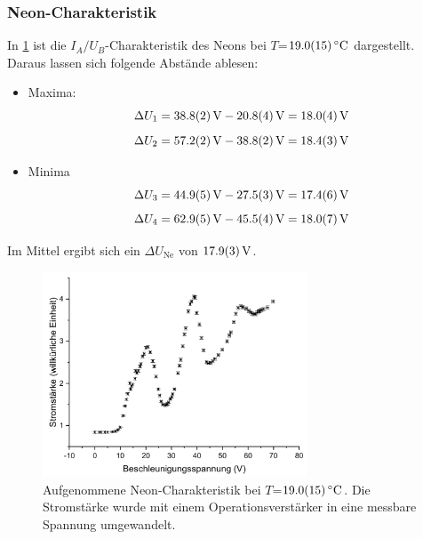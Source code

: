 \documentclass[
	a4paper,
	12pt,
	pagesize,
	ngerman
]{scrartcl}
\begin{document}
	\subsubsection{Neon-Charakteristik}
	In \cref{Ne19} ist die $I_A/U_B$-Charakteristik des Neons bei $T$=$\SI{19 +- 1,5}{\degreeCelsius}$ dargestellt. Daraus lassen sich folgende Abstände ablesen:
	\begin{itemize}
		\item Maxima:
		\begin{equation*}
		\Delta{U}_1 = \SI{38,8 +- 0,2}{V} -\SI{20,8 +- 0,4}{V} = \SI{18,0+- 0,4}{V}
		\end{equation*}
		\begin{equation*}
		\Delta{U}_2 = \SI{57,2 +- 0,2}{V} - \SI{38,8 +- 0,2}{V} = \SI{18,4 +- 0,3}{V}
		\end{equation*}
		\item Minima
		\begin{equation*}\Delta{U}_3 = \SI{44,9 +- 0,5}{V} -\SI{27,5 +- 0,3}{V} = \SI{17,4 +- 0,6}{V}\end{equation*}
		\begin{equation*}\Delta{U}_4 = \SI{62,9 +- 0,5}{V}- \SI{45,5 +- 0,4}{V} = \SI{18,0 +- 0,7}{V}\end{equation*}
	\end{itemize}
	Im Mittel ergibt sich ein $\Delta{U_\text{Ne}}$ von $\SI{17,9 +- 0,3}{V}$.
	\begin{figure}[H]
		\includegraphics[width=0.7\textwidth]{Ne19}
		\centering
		\caption{Aufgenommene Neon-Charakteristik bei $T$=$\SI{19,0 +- 1,5}{\degreeCelsius}$. Die Stromstärke wurde mit einem Operationsverstärker in eine messbare Spannung umgewandelt.}
		\label{Ne19}
		\centering
	\end{figure}
\end{document}
